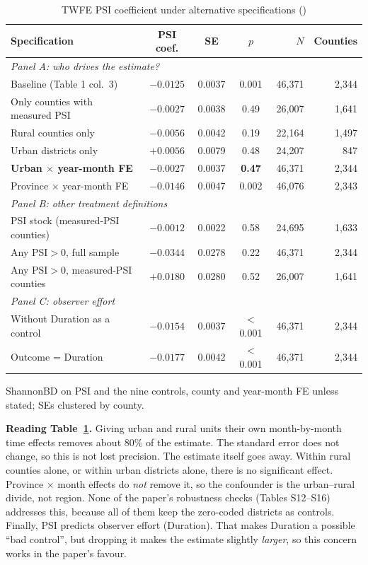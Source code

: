 \documentclass[11pt]{article}
\begin{document}
\begin{table}[H]\centering\small
\caption{TWFE PSI coefficient under alternative specifications ()}\label{tab:twfe}
\begin{tabular}{lcccrr}
\toprule
Specification & PSI coef. & SE & $p$ & $N$ & Counties\\
\midrule
\multicolumn{6}{l}{\emph{Panel A: who drives the estimate?}}\\
Baseline (Table 1 col.\ 3) & $-0.0125$ & 0.0037 & 0.001 & 46,371 & 2,344\\
Only counties with measured PSI & $-0.0027$ & 0.0038 & 0.49 & 26,007 & 1,641\\
Rural counties only & $-0.0056$ & 0.0042 & 0.19 & 22,164 & 1,497\\
Urban districts only & $+0.0056$ & 0.0079 & 0.48 & 24,207 & 847\\
\textbf{Urban $\times$ year-month FE} & $\mathbf{-0.0027}$ & 0.0037 & \textbf{0.47} & 46,371 & 2,344\\
Province $\times$ year-month FE & $-0.0146$ & 0.0047 & 0.002 & 46,076 & 2,343\\
\midrule
\multicolumn{6}{l}{\emph{Panel B: other treatment definitions}}\\
PSI stock (measured-PSI counties) & $-0.0012$ & 0.0022 & 0.58 & 24,695 & 1,633\\
Any PSI$>$0, full sample & $-0.0344$ & 0.0278 & 0.22 & 46,371 & 2,344\\
Any PSI$>$0, measured-PSI counties & $+0.0180$ & 0.0280 & 0.52 & 26,007 & 1,641\\
\midrule
\multicolumn{6}{l}{\emph{Panel C: observer effort}}\\
Without Duration as a control & $-0.0154$ & 0.0037 & $<$0.001 & 46,371 & 2,344\\
Outcome = Duration & $-0.0177$ & 0.0042 & $<$0.001 & 46,371 & 2,344\\
\bottomrule
\end{tabular}
\par\smallskip\footnotesize ShannonBD on PSI and the nine controls, county and year-month FE unless stated; SEs clustered by county.
\end{table}

\begin{whybox}\small
\textbf{Reading Table~\ref{tab:twfe}.} Giving urban and rural units their own month-by-month time effects removes about 80\% of the estimate. The standard error does not change, so this is not lost precision. The estimate itself goes away. Within rural counties alone, or within urban districts alone, there is no significant effect. Province $\times$ month effects do \emph{not} remove it, so the confounder is the urban--rural divide, not region. None of the paper's robustness checks (Tables S12--S16) addresses this, because all of them keep the zero-coded districts as controls. Finally, PSI predicts observer effort (Duration). That makes Duration a possible ``bad control'', but dropping it makes the estimate slightly \emph{larger}, so this concern works in the paper's favour.
\end{whybox}
\end{document}
